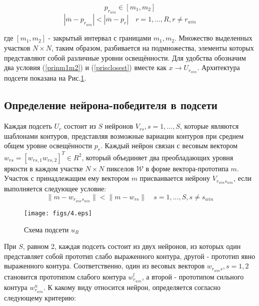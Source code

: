 \documentclass[a4paper,12pt]{report}
\begin{document}
\begin{equation}
p_{r_{win}}\in[m_1,m_2]
\label{prinm1m2}
\end{equation}
\begin{equation}
|\overline{m}-p_{r_{win}}|<|\overline{m}-p_r|\quad r=1,...,R,r\neq r_{win}
\label{prisclosest}
\end{equation}

где $[m_1,m_2]$ - закрытый интервал с границами $m_1,m_2$. Множество выделенных участков $N\times N$, таким образом, разбивается на подмножества, элементы которых представляют собой различные уровни освещённости. Для удобства обозначим два условия (\ref{prinm1m2}) и (\ref{prisclosest}) вместе как $x\rightarrow U_{r_{win}}$. Архитектура подсети показана на Рис.\ref{subnetwork1}.

\subsection{Определение нейрона-победителя в подсети}

Каждая подсеть $U_r$ состоит из $S$ нейронов $V_{rs},s =1,...,S$, которые являются шаблонами контуров, представляя возможные вариации контуров при среднем общем уровне освещённости $p_r$. Каждый нейрон связан с весовым вектором $w_{rs}=[w_{rs,1} w_{rs,2}]^T\in R^2$, который объединяет два преобладающих уровня яркости в каждом участке $N\times N$ пикселов $\mathcal{W}$ в форме вектора-прототипа $m$. Участок с принадлежащим ему вектором $m$ присваивается нейрону $V_{r_{win} s_{win}}$, если выполняется следующее условие:
\begin{equation}
\|m-w_{r_{win} s_{win}}\|<\|m-w_{rs}\|\quad s=1,...,S,s\neq s_{win}
\end{equation}

\begin{center}
\begin{figure}[!t]
\begin{center}
\texttt{[image: figs/4.eps]}
\end{center}\caption{Схема подсети $u_R$}
\label{subnetwork1}
\end{figure}
\end{center}

При $S$, равном 2, каждая подсеть состоит из двух нейронов, из которых один представляет собой прототип слабо выраженного контура, другой - прототип явно выраженного контура. Соответственно, один из весовых векторов $w_{r_{win} s},s=1,2$ становится прототипом слабого контура $w_{r_{win}}^l$, а второй - прототипом сильного контура $w_{r_{win}}^u$. К какому виду относится нейрон, определяется согласно следующему критерию: 
\end{document}
